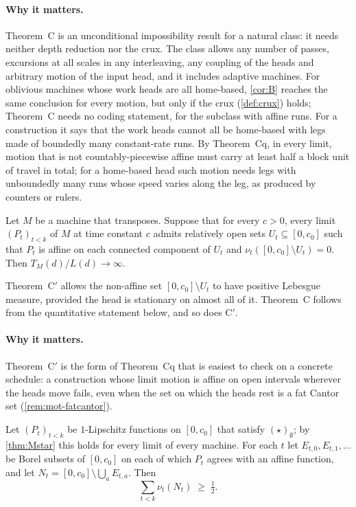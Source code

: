 \paragraph{Why it matters.} Theorem~C is an unconditional impossibility result for a natural class: it needs neither
depth reduction nor the crux. The class allows any number of passes, excursions at all scales in any interleaving, any
coupling of the heads and arbitrary motion of the input head, and it includes adaptive machines. For oblivious machines whose work heads are all
home-based, \cref{cor:B} reaches the same conclusion for every motion, but only if the crux (\cref{def:crux}) holds;
Theorem~C needs no coding statement, for the subclass with affine runs. For a construction it
says that the work heads cannot all be home-based with legs made of boundedly many constant-rate runs. By Theorem~Cq,
in every limit, motion that is not countably-piecewise affine must carry at least half a block unit of travel in
total; for a home-based head such motion needs legs with unboundedly many runs whose speed varies along the leg, as
produced by counters or rulers.

\begin{theorem}\label{thm:mot-Cprime}
\notformalized
Let $M$ be a machine that transposes. Suppose that for every $c>0$, every limit $(P_t)_{t<k}$ of $M$ at time constant
$c$ admits relatively open sets $U_t\subseteq[0,c_0]$ such that $P_t$ is affine on each connected component of $U_t$ and
$\nu_t([0,c_0]\setminus U_t)=0$. Then $T_M(d)/L(d)\to\infty$.
\end{theorem}

Theorem~C$'$ allows the non-affine set $[0,c_0]\setminus U_t$ to have positive Lebesgue measure, provided the head is
stationary on almost all of it. Theorem~C follows from the quantitative statement below, and so does C$'$.

\paragraph{Why it matters.} Theorem~C$'$ is the form of Theorem~Cq that is easiest to check on a concrete schedule: a
construction whose limit motion is affine on open intervals wherever the heads move fails, even when the set on which
the heads rest is a fat Cantor set (\cref{rem:mot-fatcantor}).

\begin{theorem}\label{thm:Cq}
\notformalized
Let $(P_t)_{t<k}$ be $1$-Lipschitz functions on $[0,c_0]$ that satisfy $(\star)_\emptyset$; by \cref{thm:Mstar} this
holds for every limit of every machine. For each $t$ let $E_{t,0},E_{t,1},\dots$ be Borel subsets of $[0,c_0]$ on each
of which $P_t$ agrees with an affine function, and let $N_t=[0,c_0]\setminus\bigcup_aE_{t,a}$. Then
\[
  \sum_{t<k}\nu_t(N_t)\;\ge\;\tfrac12 .
\]
\end{theorem}

